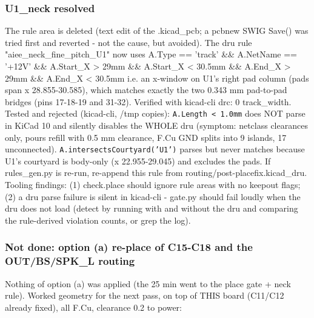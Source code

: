 \documentclass[11pt]{article}
\begin{document}
\subsubsection*{U1\_neck resolved}
The rule area is deleted (text edit of the .kicad\_pcb; a pcbnew SWIG Save() was tried first and reverted - not the cause, but avoided). The dru rule "aiee\_neck\_fine\_pitch\_U1" now uses A.Type == 'track' \&\& A.NetName == '+12V' \&\& A.Start\_X \textgreater{} 29mm \&\& A.Start\_X \textless{} 30.5mm \&\& A.End\_X \textgreater{} 29mm \&\& A.End\_X \textless{} 30.5mm i.e. an x-window on U1's right pad column (pads span x 28.855-30.585), which matches exactly the two 0.343 mm pad-to-pad bridges (pins 17-18-19 and 31-32). Verified with kicad-cli drc: 0 track\_width. Tested and rejected (kicad-cli, /tmp copies): \texttt{A.Length \textless{} 1.0mm} does NOT parse in KiCad 10 and silently disables the WHOLE dru (symptom: netclass clearances only, pours refill with 0.5 mm clearance, F.Cu GND splits into 9 islands, 17 unconnected). \texttt{A.intersectsCourtyard('U1')} parses but never matches because U1's courtyard is body-only (x 22.955-29.045) and excludes the pads. If rules\_gen.py is re-run, re-append this rule from routing/post-placefix.kicad\_dru. Tooling findings: (1) check.place should ignore rule areas with no keepout flags; (2) a dru parse failure is silent in kicad-cli - gate.py should fail loudly when the dru does not load (detect by running with and without the dru and comparing the rule-derived violation counts, or grep the log).

\subsubsection*{Not done: option (a) re-place of C15-C18 and the OUT/BS/SPK\_L routing}
Nothing of option (a) was applied (the 25 min went to the place gate + neck rule). Worked geometry for the next pass, on top of THIS board (C11/C12 already fixed), all F.Cu, clearance 0.2 to power:
\end{document}
